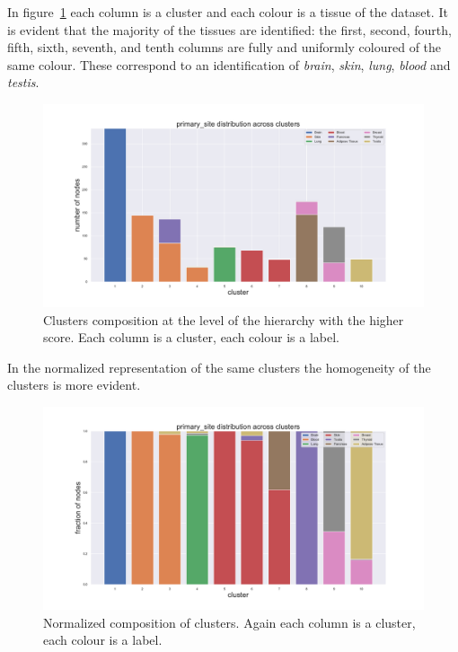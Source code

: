 \clearpage
In figure~\ref{fig:topic/gtex/oversigma_10tissue/clustercomposition_l3_primary_site} each column is a cluster and each colour is a tissue of the dataset. It is evident that the majority of the tissues are identified: the first, second, fourth, fifth, sixth, seventh, and tenth columns are fully and uniformly coloured of the same colour. These correspond to an identification of \textit{brain}, \textit{skin}, \textit{lung}, \textit{blood} and \textit{testis}.
\begin{figure}[htb!]
    \centering
    \includegraphics[width=0.9\linewidth]{pictures/topic/gtex/oversigma_10tissue/clustercomposition_l3_primary_site.pdf}
    \caption{Clusters composition at the level of the hierarchy with the higher score. Each column is a cluster, each colour is a label.}
    \label{fig:topic/gtex/oversigma_10tissue/clustercomposition_l3_primary_site}
\end{figure}
In the normalized representation of the same clusters the homogeneity of the clusters is more evident.
\begin{figure}[htb!]
    \centering
    \includegraphics[width=0.9\linewidth]{pictures/topic/gtex/oversigma_10tissue/fraction_clustercomposition_l3_primary_site.pdf}
    \caption{Normalized composition of clusters. Again each column is a cluster, each colour is a label.}
    \label{fig:topic/gtex/oversigma_10tissue/fraction_clustercomposition_l3_primary_site}
\end{figure}
